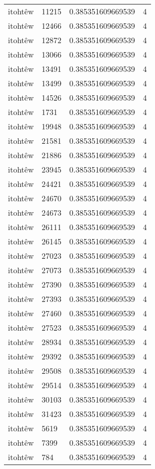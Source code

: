 \begin{longtable}{llll}
itohtêw & 11215 & 0.385351609669539 & 4 \\
itohtêw & 12466 & 0.385351609669539 & 4 \\
itohtêw & 12872 & 0.385351609669539 & 4 \\
itohtêw & 13066 & 0.385351609669539 & 4 \\
itohtêw & 13491 & 0.385351609669539 & 4 \\
itohtêw & 13499 & 0.385351609669539 & 4 \\
itohtêw & 14526 & 0.385351609669539 & 4 \\
itohtêw & 1731 & 0.385351609669539 & 4 \\
itohtêw & 19948 & 0.385351609669539 & 4 \\
itohtêw & 21581 & 0.385351609669539 & 4 \\
itohtêw & 21886 & 0.385351609669539 & 4 \\
itohtêw & 23945 & 0.385351609669539 & 4 \\
itohtêw & 24421 & 0.385351609669539 & 4 \\
itohtêw & 24670 & 0.385351609669539 & 4 \\
itohtêw & 24673 & 0.385351609669539 & 4 \\
itohtêw & 26111 & 0.385351609669539 & 4 \\
itohtêw & 26145 & 0.385351609669539 & 4 \\
itohtêw & 27023 & 0.385351609669539 & 4 \\
itohtêw & 27073 & 0.385351609669539 & 4 \\
itohtêw & 27390 & 0.385351609669539 & 4 \\
itohtêw & 27393 & 0.385351609669539 & 4 \\
itohtêw & 27460 & 0.385351609669539 & 4 \\
itohtêw & 27523 & 0.385351609669539 & 4 \\
itohtêw & 28934 & 0.385351609669539 & 4 \\
itohtêw & 29392 & 0.385351609669539 & 4 \\
itohtêw & 29508 & 0.385351609669539 & 4 \\
itohtêw & 29514 & 0.385351609669539 & 4 \\
itohtêw & 30103 & 0.385351609669539 & 4 \\
itohtêw & 31423 & 0.385351609669539 & 4 \\
itohtêw & 5619 & 0.385351609669539 & 4 \\
itohtêw & 7399 & 0.385351609669539 & 4 \\
itohtêw & 784 & 0.385351609669539 & 4 \\

\end{longtable}
